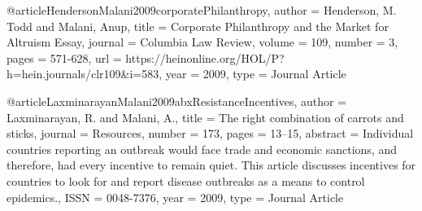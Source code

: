 


@article{HendersonMalani2009corporatePhilanthropy,
   author = {Henderson, M. Todd and Malani, Anup},
   title = {Corporate Philanthropy and the Market for Altruism Essay},
   journal = {Columbia Law Review},
   volume = {109},
   number = {3},
   pages = {571-628},
   url = {https://heinonline.org/HOL/P?h=hein.journals/clr109&i=583},
   year = {2009},
   type = {Journal Article}
}

@article{LaxminarayanMalani2009abxResistanceIncentives,
   author = {Laxminarayan, R. and Malani, A.},
   title = {The right combination of carrots and sticks},
   journal = {Resources},
   number = {173},
   pages = {13–15},
   abstract = {Individual countries reporting an outbreak would face trade and economic sanctions, and therefore, had every incentive to remain quiet. This article discusses incentives for countries to look for and report disease outbreaks as a means to control epidemics.},
   ISSN = {0048-7376},
   year = {2009},
   type = {Journal Article}
}



